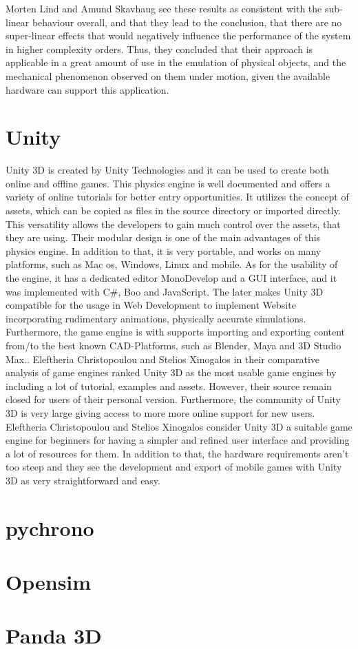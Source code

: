 \documentclass[
	12pt, 
	a4paper, 
]{article}
\begin{document}
	Morten Lind and Amund Skavhaug see these results as consistent with the sub-linear behaviour overall, and that they lead to the conclusion, that there are no super-linear effects that would negatively influence the performance of the system in higher complexity orders. Thus, they concluded that their approach is applicable in a great amount of use in the emulation of physical objects, and the mechanical phenomenon observed on them under motion, given the available hardware can support this application\cite{lind2012using}.
	\section{Unity}
	Unity 3D is created by Unity Technologies and it can be used to create both online and offline games. This physics engine is well documented and offers a variety of online tutorials for better entry opportunities. It utilizes the concept of assets, which can be copied as files in the source directory or imported directly. This versatility allows the developers to gain much control over the assets, that they are using. Their modular design is one of the main advantages of this physics engine. In addition to that, it is very portable, and works on many platforms, such as Mac os, Windows, Linux and mobile.\cite{mat2014using}\newline
	As for the usability of the engine, it has a dedicated editor MonoDevelop and a GUI interface, and it was implemented with C\#, Boo and JavaScript.\cite{christopoulou2017overview} The later makes Unity 3D compatible for the usage in Web Development to implement Website incorporating rudimentary animations, physically accurate simulations. Furthermore, the game engine is with supports importing and exporting content from/to the best known CAD-Platforms, such as Blender, Maya and 3D Studio Max.\cite{christopoulou2017overview}.\newline
	Eleftheria Christopoulou and Stelios Xinogalos in their comparative analysis of game engines ranked Unity 3D as the most usable game engines by including a lot of tutorial, examples and assets. However, their source remain closed for users of their personal version. Furthermore, the community of Unity 3D is very large giving access to more more online support for new users\cite{christopoulou2017overview}. Eleftheria Christopoulou and Stelios Xinogalos consider Unity 3D a suitable game engine for beginners for having a simpler and refined user interface and providing a lot of resources for them. In addition to that, the hardware requirements aren't too steep and they see the development and export of mobile games with Unity 3D as very straightforward and easy\cite{christopoulou2017overview}.
	\section{pychrono}
	\section{Opensim}
	\section{Panda 3D}
	\printbibliography
\end{document}
